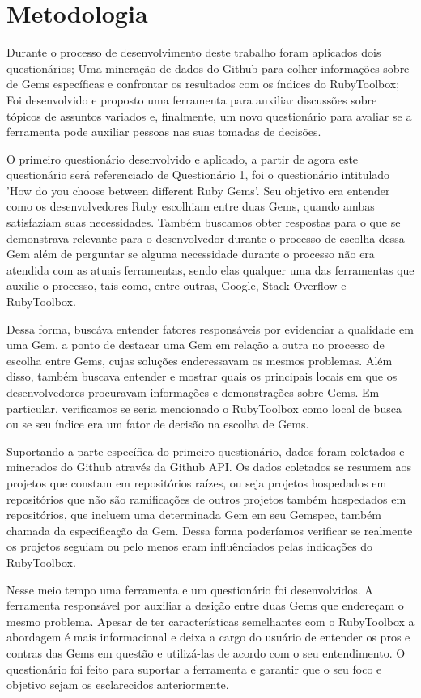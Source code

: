 \chapter{Metodologia}

Durante o processo de desenvolvimento deste trabalho foram aplicados dois questionários; Uma mineração de dados do Github para colher informações sobre de Gems específicas e confrontar os resultados com os índices do RubyToolbox; Foi desenvolvido e proposto uma ferramenta para auxiliar discussões sobre tópicos de assuntos variados e, finalmente, um novo questionário para avaliar se a ferramenta pode auxiliar pessoas nas suas tomadas de decisões.

O primeiro questionário desenvolvido e aplicado, a partir de agora este questionário será referenciado de Questionário 1, foi o questionário intitulado 'How do you choose between different Ruby Gems'. Seu objetivo era entender como os desenvolvedores Ruby escolhiam entre duas Gems, quando ambas satisfaziam suas necessidades. Também buscamos obter respostas para o que se demonstrava relevante para o desenvolvedor durante o processo de escolha dessa Gem além de perguntar se alguma necessidade durante o processo não era atendida com as atuais ferramentas, sendo elas qualquer uma das ferramentas que auxilie o processo, tais como, entre outras, Google, Stack Overflow e RubyToolbox.

Dessa forma, buscáva entender fatores responsáveis por evidenciar a qualidade em uma Gem, a ponto de destacar uma Gem em relação a outra no processo de escolha entre Gems, cujas soluções enderessavam os mesmos problemas. Além disso, também buscava entender e mostrar quais os principais locais em que os desenvolvedores procuravam informações e demonstrações sobre Gems. Em particular, verificamos se seria mencionado o RubyToolbox como local de busca ou se seu índice era um fator de decisão na escolha de Gems.

Suportando a parte específica do primeiro questionário, dados foram coletados e minerados do Github através da Github API. Os dados coletados se resumem aos projetos que constam em repositórios raízes, ou seja projetos hospedados em repositórios que não são ramificações de outros projetos também hospedados em repositórios, que incluem uma determinada Gem em seu Gemspec, também chamada da especificação da Gem. Dessa forma poderíamos verificar se realmente os projetos seguiam ou pelo menos eram influênciados pelas indicações do RubyToolbox.

Nesse meio tempo uma ferramenta e um questionário foi desenvolvidos. A ferramenta responsável por auxiliar a desição entre duas Gems que endereçam o mesmo problema. Apesar de ter características semelhantes com o RubyToolbox a abordagem é mais informacional e deixa a cargo do usuário de entender os pros e contras das Gems em questão e utilizá-las de acordo com o seu entendimento. O questionário foi feito para suportar a ferramenta e garantir que o seu foco e objetivo sejam os esclarecidos anteriormente.